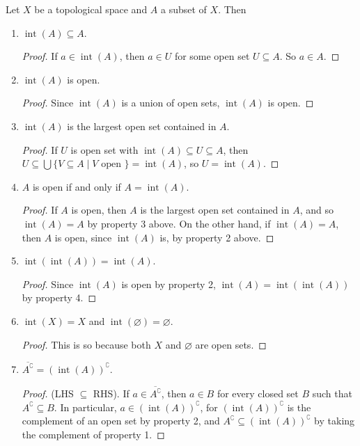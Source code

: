 \documentclass[12pt]{article}
\def\int{\operatorname{int}}
\def\emptyset{\varnothing}
\begin{document}
Let $X$ be a topological space and $A$ a subset of $X$.  Then

\begin{enumerate}
\item $\int(A)\subseteq A$.
\begin{proof} If $a\in \int(A)$, then $a\in U$ for some open set $U\subseteq A$.  So $a\in A$.
\end{proof}
\item $\int(A)$ is open.
\begin{proof} Since $\int(A)$ is a union of open sets, $\int(A)$ is open.
\end{proof}
\item $\int(A)$ is the largest open set contained in $A$.
\begin{proof}
If $U$ is open set with $\int(A)\subseteq U\subseteq A$, then $U\subseteq\bigcup \lbrace V\subseteq A\mid V\mbox{ open }\rbrace = \int(A)$, so $U=\int(A)$.  
\end{proof}
\item $A$ is open if and only if $A=\int(A)$.
\begin{proof}
If $A$ is open, then $A$ is the largest open set contained in $A$, and so $\int(A)=A$ by property 3 above.  On the other hand, if $\int(A)=A$, then $A$ is open, since $\int(A)$ is, by property 2 above. 
\end{proof}
\item $\int(\int(A))=\int(A)$.
\begin{proof} Since $\int(A)$ is open by property 2, $\int(A)=\int(\int(A))$ by property 4.
\end{proof}
\item $\int(X)=X$ and $\int(\emptyset)=\emptyset$.
\begin{proof}  This is so because both $X$ and $\emptyset$ are open sets.
\end{proof}
\item $\overline{A^\complement}=(\int(A))^\complement$.
\begin{proof}  (LHS $\subseteq$ RHS).  If $a\in \overline{A^\complement}$, then $a\in B$ for every closed set $B$ such that $A^\complement \subseteq B$.  In particular, $a\in (\int(A))^\complement$, for $(\int(A))^\complement$ is the complement of an open set by property 2, and $A^\complement \subseteq (\int(A))^\complement$ by taking the complement of property 1.


\end{proof}
\end{enumerate}
\end{document}
